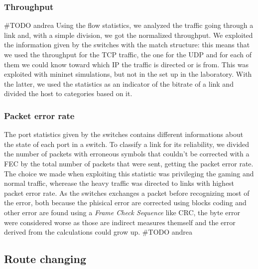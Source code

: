 \documentclass[conference,10pt]{IEEEtran}
\begin{document}
    \subsubsection{Throughput}
	  \#TODO andrea
		Using the flow statistics, we analyzed the traffic going through a link and, with a simple division, we got the normalized throughput.
		We exploited the information given by the switches with the match structure: this means that we used the throughput for the TCP traffic,
		the one for the UDP and for each of them we could know toward which IP the traffic is directed or is from. This was exploited with mininet
		simulations, but not in the set up in the laboratory. With the latter, we used the statistics as an indicator of the bitrate of a link
		and divided the host to categories based on it.
\\
		\subsubsection{Packet error rate}

		The port statistics given by the switches contains different informations about the state of each port in a switch. To classify a link for its
		reliability, we divided the number of packets with erroneous symbols that couldn't be corrected with a FEC by the total number of packets that were sent,
		getting the packet error rate. The choice we made when exploiting this statistic was privileging the gaming and normal traffic, wherease the
		heavy traffic was directed to links with highest packet error rate.  As the switches exchanges a packet before recognizing most of the error, both because the
		phisical error are corrected using blocks coding and other error are found using a \textit{Frame Check Sequence} like CRC, the byte error were considered worse as
		those are indirect measures themself and the error derived from the calculations could grow up.
		\#TODO andrea
\\
  \subsection{Route changing} %
\end{document}
